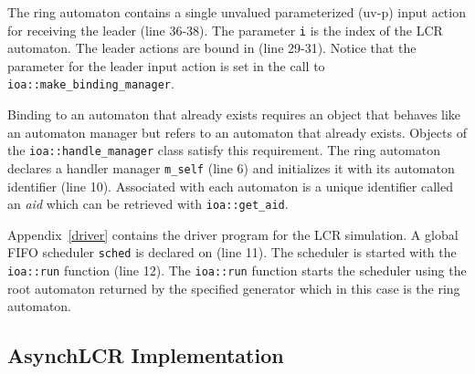 The ring automaton contains a single unvalued parameterized (uv-p) input action for receiving the leader (line 36-38).
The parameter \verb+i+ is the index of the LCR automaton.
The leader actions are bound in (line 29-31).
Notice that the parameter for the leader input action is set in the call to \verb+ioa::make_binding_manager+.

Binding to an automaton that already exists requires an object that behaves like an automaton manager but refers to an automaton that already exists.
Objects of the \verb+ioa::handle_manager+ class satisfy this requirement.
The ring automaton declares a handler manager \verb+m_self+ (line 6) and initializes it with its automaton identifier (line 10).
Associated with each automaton is a unique identifier called an \emph{aid} which can be retrieved with \verb+ioa::get_aid+.

Appendix~\ref{driver} contains the driver program for the LCR simulation.
A global FIFO scheduler \verb+sched+ is declared on (line 11).
The scheduler is started with the \verb+ioa::run+ function (line 12).
The \verb+ioa::run+ function starts the scheduler using the root automaton returned by the specified generator which in this case is the ring automaton.

\subsection{AsynchLCR Implementation}



